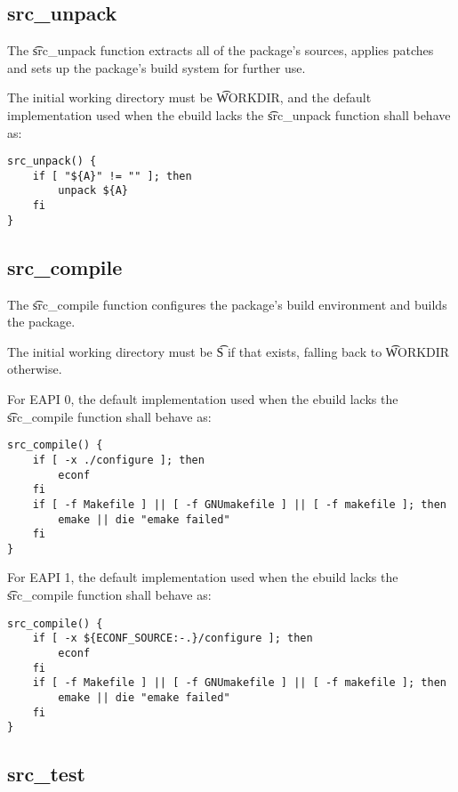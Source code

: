 \subsection{src\_unpack}
\label{src-unpack-function}

The \t{src\_unpack} function extracts all of the package's sources, applies patches and sets up the
package's build system for further use.

The initial working directory must be \t{WORKDIR}, and the default implementation used when
the ebuild lacks the \t{src\_unpack} function shall behave as:

\begin{lstlisting}
src_unpack() {
    if [ "${A}" != "" ]; then
        unpack ${A}
    fi
}
\end{lstlisting}

\subsection{src\_compile}
\label{src-compile-function}

The \t{src\_compile} function configures the package's build environment and builds the package.

The initial working directory must be \t{S} if that exists, falling back to \t{WORKDIR} otherwise.

For EAPI 0, the default implementation used when the ebuild lacks the \t{src\_compile} function
shall behave as:

\begin{lstlisting}
src_compile() {
    if [ -x ./configure ]; then
        econf
    fi
    if [ -f Makefile ] || [ -f GNUmakefile ] || [ -f makefile ]; then
        emake || die "emake failed"
    fi
}
\end{lstlisting}

For EAPI 1, the default implementation used when the ebuild lacks the \t{src\_compile} function
shall behave as:

\begin{lstlisting}
src_compile() {
    if [ -x ${ECONF_SOURCE:-.}/configure ]; then
        econf
    fi
    if [ -f Makefile ] || [ -f GNUmakefile ] || [ -f makefile ]; then
        emake || die "emake failed"
    fi
}
\end{lstlisting}

\subsection{src\_test}
\label{src-test-function}

